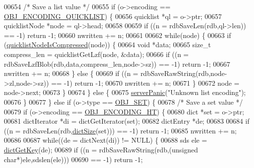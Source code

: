 \begin{DoxyCode}
{{{{{{{{00654         \textcolor{comment}{/* Save a list value */}
00655         \textcolor{keywordflow}{if} (o->encoding == \hyperlink{server_8h_aec792aeed6d4bf83966672e6a23043b8}{OBJ\_ENCODING\_QUICKLIST}) \{
00656             quicklist *ql = o->ptr;
00657             quicklistNode *node = ql->head;
00658 
00659             \textcolor{keywordflow}{if} ((n = rdbSaveLen(rdb,ql->len)) == -1) \textcolor{keywordflow}{return} -1;
00660             nwritten += n;
00661 
00662             \textcolor{keywordflow}{while}(node) \{
00663                 \textcolor{keywordflow}{if} (\hyperlink{quicklist_8h_a5ef6eede0028ac5ef22c208cd7828aed}{quicklistNodeIsCompressed}(node)) \{
00664                     \textcolor{keywordtype}{void} *data;
00665                     size\_t compress\_len = quicklistGetLzf(node, &data);
00666                     \textcolor{keywordflow}{if} ((n = rdbSaveLzfBlob(rdb,data,compress\_len,node->sz)) == -1) \textcolor{keywordflow}{return} -1;
00667                     nwritten += n;
00668                 \} \textcolor{keywordflow}{else} \{
00669                     \textcolor{keywordflow}{if} ((n = rdbSaveRawString(rdb,node->zl,node->sz)) == -1) \textcolor{keywordflow}{return} -1;
00670                     nwritten += n;
00671                 \}
00672                 node = node->next;
00673             \}
00674         \} \textcolor{keywordflow}{else} \{
00675             \hyperlink{server_8h_a11cc378e7778a830b41240578de3b204}{serverPanic}(\textcolor{stringliteral}{"Unknown list encoding"});
00676         \}
00677     \} \textcolor{keywordflow}{else} \textcolor{keywordflow}{if} (o->type == \hyperlink{server_8h_a8d179375a4aac33d3fa7aa80c8ccc75f}{OBJ\_SET}) \{
00678         \textcolor{comment}{/* Save a set value */}
00679         \textcolor{keywordflow}{if} (o->encoding == \hyperlink{server_8h_a9c10219f68afc557d510d108257d238b}{OBJ\_ENCODING\_HT}) \{
00680             dict *set = o->ptr;
00681             dictIterator *di = dictGetIterator(set);
00682             dictEntry *de;
00683 
00684             \textcolor{keywordflow}{if} ((n = rdbSaveLen(rdb,\hyperlink{dict_8h_af193430dd3d5579a52b194512f72c1f0}{dictSize}(set))) == -1) \textcolor{keywordflow}{return} -1;
00685             nwritten += n;
00686 
00687             \textcolor{keywordflow}{while}((de = dictNext(di)) != NULL) \{
00688                 sds ele = \hyperlink{dict_8h_a3271c334309904a3086deca94f96e46e}{dictGetKey}(de);
00689                 \textcolor{keywordflow}{if} ((n = rdbSaveRawString(rdb,(\textcolor{keywordtype}{unsigned} \textcolor{keywordtype}{char}*)ele,sdslen(ele)))
00690                     == -1) \textcolor{keywordflow}{return} -1;
}}}}}}}}
\end{DoxyCode}

